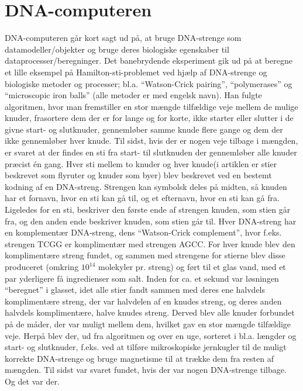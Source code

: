 \documentclass[10pt,a4paper]{article}
\begin{document}
\section{DNA-computeren}
DNA-computeren går kort sagt ud på, at bruge DNA-strenge som 
datamodeller/objekter og bruge deres biologiske egenskaber til 
dataprocesser/beregninger. 
Det banebrydende eksperiment gik ud på at beregne et lille eksempel på 
Hamilton-sti-problemet ved hjælp af DNA-strenge og biologiske metoder og 
processer; bl.a. ``Watson-Crick pairing'', ``polymerases'' og ``microscopic iron
 balls'' (alle metoder er med engelsk navn). Han fulgte algoritmen, hvor man 
 fremstiller en stor mængde tilfældige veje mellem de mulige knuder, frasortere 
 dem der er for lange og for korte, ikke starter eller slutter i de givne start- og slutknuder, gennemløber samme knude flere gange og dem der ikke gennemløber hver knude. Til sidst, hvis der er nogen veje tilbage i mængden, er svaret at der findes en sti fra start- til slutknuden der gennemløber alle knuder præcist én gang.
Hver sti mellem to knuder og hver knude(i artiklen er stier beskrevet som flyruter og knuder 
som byer) blev beskrevet ved en bestemt kodning af en DNA-streng. Strengen kan symbolsk deles på midten, så knuden har et fornavn, hvor en sti kan gå til, og et efternavn, hvor en sti kan gå fra. Ligeledes for en sti, beskriver den første ende af strengen knuden, som stien går fra, og den anden ende beskriver knuden, som stien går til. Hver DNA-streng har en komplementær DNA-streng, dens ``Watson-Crick complement'', hvor f.eks. strengen TCGG er komplimentær med strengen AGCC. For hver knude blev den komplimentære streng fundet, og sammen med strengene for stierne blev disse produceret (omkring $10^{14}$ molekyler pr. streng) og ført til et glas vand, med et par yderligere få ingredienser som salt. Inden for ca. et sekund var løsningen ``beregnet'' i glasset, idet alle stier fandt sammen med deres ene halvdels komplimentære streng, der var halvdelen af en knudes streng, og deres anden halvdels komplimentære, halve knudes streng. Derved blev alle knuder forbundet på de måder, der var muligt mellem dem, hvilket gav en stor mængde tilfældige veje. Herpå blev der, ud fra algoritmen og over en uge, sorteret i bl.a. længder og start- og slutknuder, f.eks. ved at tilføre mikroskopiske jernkugler til de muligt korrekte DNA-strenge og bruge magnetisme til at trække dem fra resten af mængden. Til sidst var svaret fundet, hvis der var nogen DNA-strenge tilbage. Og det var der.
\end{document}

